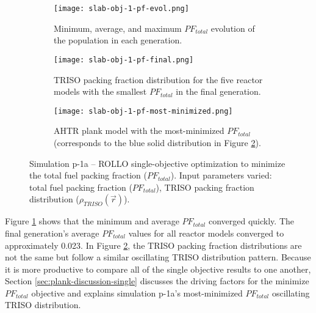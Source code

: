 \begin{figure}[htbp!]
    \centering
    \begin{subfigure}{0.9\textwidth}
        \texttt{[image: slab-obj-1-pf-evol.png]}
        \caption{Minimum, average, and maximum $PF_{total}$ evolution of the 
        population in each generation.}
        \label{fig:slab-obj-1-pf-evol} 
    \end{subfigure}
    \begin{subfigure}{0.9\textwidth}
        \texttt{[image: slab-obj-1-pf-final.png]}
        \caption{TRISO packing fraction distribution for the five reactor models with the 
        smallest $PF_{total}$ in the final generation.}
        \label{fig:slab-obj-1-pf-final} 
    \end{subfigure}
    \begin{subfigure}{0.9\textwidth}
        \texttt{[image: slab-obj-1-pf-most-minimized.png]}
        \caption{\gls{AHTR} plank model with the most-minimized $PF_{total}$ 
        (corresponds to the blue solid distribution in Figure 
        \ref{fig:slab-obj-1-pf-final}).}
        \label{fig:slab-obj-1-pf-most-minimized} 
    \end{subfigure}
    \caption{Simulation p-1a -- ROLLO single-objective optimization to minimize the 
    total fuel packing fraction ($PF_{total}$). 
    Input parameters varied: total fuel packing fraction 
    ($PF_{total}$), \gls{TRISO} packing fraction distribution ($\rho_{TRISO}(\vec{r})$).}
    \label{fig:slab-obj-1-pf}
\end{figure}
Figure \ref{fig:slab-obj-1-pf-evol} shows that the minimum and average $PF_{total}$ 
converged quickly. 
The final generation's average $PF_{total}$ values for all reactor models 
converged to approximately 0.023. 
In Figure \ref{fig:slab-obj-1-pf-final}, the \gls{TRISO} packing fraction
distributions are not the same but follow a similar oscillating 
TRISO distribution pattern. 
Because it is more productive to compare all of the single objective results to one 
another, Section \ref{sec:plank-discussion-single} discusses the driving factors for
the minimize $PF_{total}$ objective and explains simulation p-1a's most-minimized 
$PF_{total}$ oscillating TRISO distribution. 


